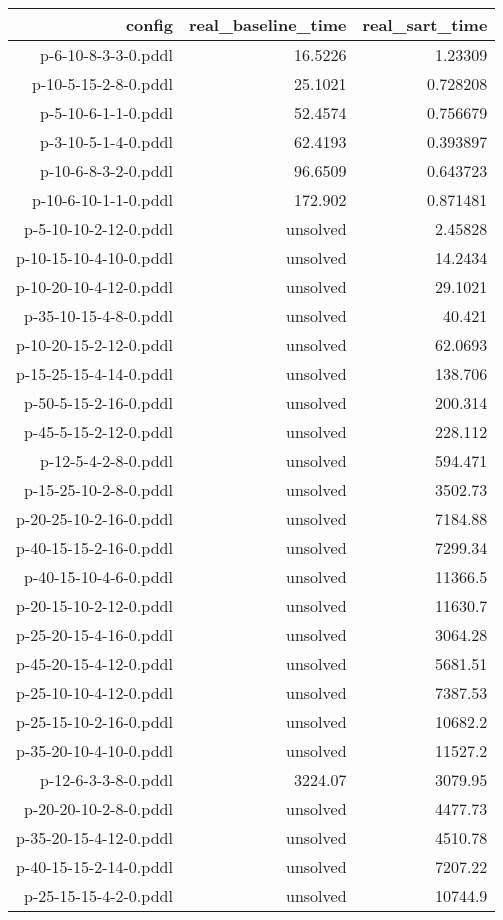 \documentclass{article}
\begin{document}
                            \begin{center}
                            \scriptsize
                            \begin{tabular}{r|r|r}
                            config & real\_baseline\_time & real\_sart\_time\\\midrule
                             p-6-10-8-3-3-0.pddl&16.5226&1.23309\\
 p-10-5-15-2-8-0.pddl&25.1021&0.728208\\
 p-5-10-6-1-1-0.pddl&52.4574&0.756679\\
 p-3-10-5-1-4-0.pddl&62.4193&0.393897\\
 p-10-6-8-3-2-0.pddl&96.6509&0.643723\\
 p-10-6-10-1-1-0.pddl&172.902&0.871481\\
 p-5-10-10-2-12-0.pddl&unsolved&2.45828\\
 p-10-15-10-4-10-0.pddl&unsolved&14.2434\\
 p-10-20-10-4-12-0.pddl&unsolved&29.1021\\
 p-35-10-15-4-8-0.pddl&unsolved&40.421\\
 p-10-20-15-2-12-0.pddl&unsolved&62.0693\\
 p-15-25-15-4-14-0.pddl&unsolved&138.706\\
 p-50-5-15-2-16-0.pddl&unsolved&200.314\\
 p-45-5-15-2-12-0.pddl&unsolved&228.112\\
 p-12-5-4-2-8-0.pddl&unsolved&594.471\\
 p-15-25-10-2-8-0.pddl&unsolved&3502.73\\
 p-20-25-10-2-16-0.pddl&unsolved&7184.88\\
 p-40-15-15-2-16-0.pddl&unsolved&7299.34\\
 p-40-15-10-4-6-0.pddl&unsolved&11366.5\\
 p-20-15-10-2-12-0.pddl&unsolved&11630.7\\
 p-25-20-15-4-16-0.pddl&unsolved&3064.28\\
 p-45-20-15-4-12-0.pddl&unsolved&5681.51\\
 p-25-10-10-4-12-0.pddl&unsolved&7387.53\\
 p-25-15-10-2-16-0.pddl&unsolved&10682.2\\
 p-35-20-10-4-10-0.pddl&unsolved&11527.2\\
 p-12-6-3-3-8-0.pddl&3224.07&3079.95\\
 p-20-20-10-2-8-0.pddl&unsolved&4477.73\\
 p-35-20-15-4-12-0.pddl&unsolved&4510.78\\
 p-40-15-15-2-14-0.pddl&unsolved&7207.22\\
 p-25-15-15-4-2-0.pddl&unsolved&10744.9
                            \end{tabular}
                            \end{center}
                    
\end{document}

